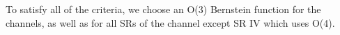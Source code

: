 To satisfy all of the criteria, we choose an O(3) Bernstein function for the \twocentral channels, as well as for all SRs of the \fourcentral channel except SR IV which uses O(4).  


%



